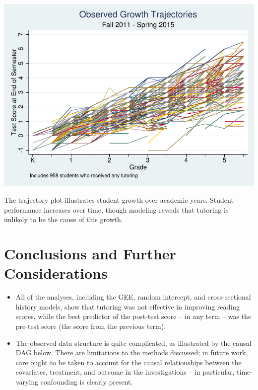 \documentclass[a0,landscape]{a0poster}
\begin{document}
\begin{multicols}{3}
\color{NavyBlue}

\begin{center}\vspace{1cm}
\includegraphics[width=0.8\linewidth]{xtline.pdf}
\end{center}\vspace{0.5cm}

The trajectory plot illustrates student growth over academic years.
Student performance increases over time, though modeling reveals 
that tutoring is unlikely to be the cause of this growth.\vspace{-1cm}


\color{SaddleBrown} %

\section*{Conclusions and Further Considerations}

\begin{itemize}
\setlength\itemsep{0.5ex}
\item All of the analyses, including the GEE, random intercept,
and cross-sectional history models, show that tutoring
was not effective in improving reading scores,
while the best predictor of the post-test score
-- in any term -- was the pre-test score
(the score from the previous term).
\item The observed data structure is quite complicated,
as illustrated by the causal DAG below.
There are limitations to the methods discussed;
in future work, care ought to be taken to account for the
causal relationships between the covariates, treatment,
and outcome in the investigations -- in particular,
time-varying confounding is clearly present.
\end{itemize}


\end{multicols}
\end{document}
